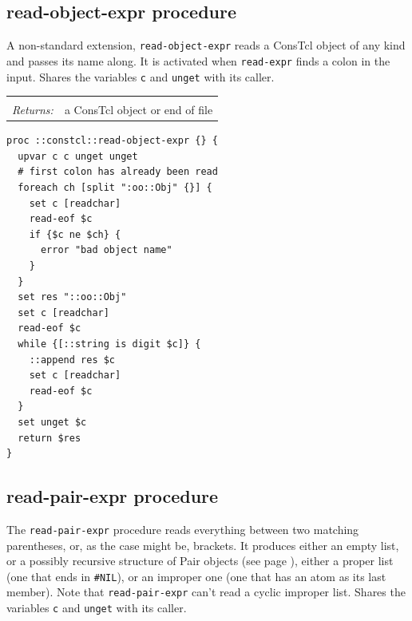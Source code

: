 \documentclass[twoside]{report}
\begin{document}
\subsection{read-object-expr procedure}
\label{readobjectexpr-procedure}

A non-standard extension, \texttt{read-object-expr} reads a ConsTcl object of any kind and passes its name along. It is activated when \texttt{read-expr} finds a colon in the input. Shares the variables \texttt{c} and \texttt{unget} with its caller.

\noindent\begin{tabular}{ |p{1.9cm} p{8cm}| }
\hline
\rowcolor[HTML]{CCCCCC} \multicolumn{2}{|l|}{\bf read-object-expr (internal)} \\
\textit{Returns:} & a ConsTcl object or end of file \\
\hline
\end{tabular}

\begin{lstlisting}
proc ::constcl::read-object-expr {} {
  upvar c c unget unget
  # first colon has already been read
  foreach ch [split ":oo::Obj" {}] {
    set c [readchar]
    read-eof $c
    if {$c ne $ch} {
      error "bad object name"
    }
  }
  set res "::oo::Obj"
  set c [readchar]
  read-eof $c
  while {[::string is digit $c]} {
    ::append res $c
    set c [readchar]
    read-eof $c
  }
  set unget $c
  return $res
}
\end{lstlisting}

\subsection{read-pair-expr procedure}
\label{readpairexpr-procedure}

The \texttt{read-pair-expr} procedure reads everything between two matching parentheses, or, as the case might be, brackets. It produces either an empty list, or a possibly recursive structure of Pair objects (see page \pageref{pairs-and-lists}), either a proper list (one that ends in \texttt{\#NIL}), or an improper one (one that has an atom as its last member). Note that \texttt{read-pair-expr} can't read a cyclic improper list. Shares the variables \texttt{c} and \texttt{unget} with its caller.
\end{document}
